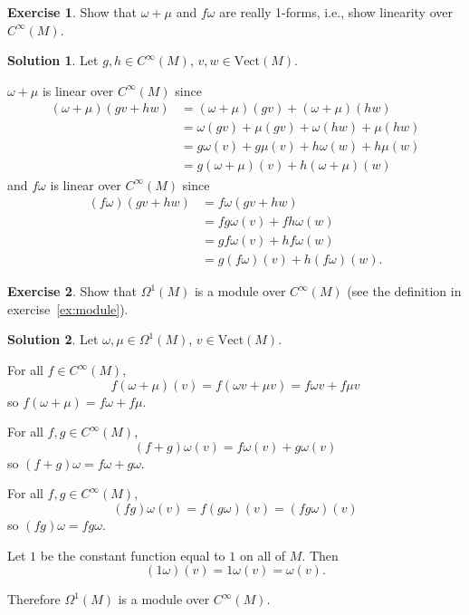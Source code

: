 \documentclass[11pt, a4paper]{article}
\theoremstyle{definition}
\newtheorem{ex}{Exercise}[part]
\newtheorem{sol}{Solution}[part]
\begin{document}
\begin{ex}

Show that $\omega + \mu$ and $f\omega$ are really 1-forms, i.e., show linearity over $C^\infty(M)$.

\end{ex}

\begin{sol}

Let $g, h \in C^\infty(M)$, $v, w \in \text{Vect}(M)$.

$\omega + \mu$ is linear over $C^\infty(M)$ since
\begin{align*}
    (\omega + \mu)(gv + hw) &= (\omega + \mu)(gv) + (\omega + \mu)(hw) \\
        &= \omega(gv) + \mu(gv) + \omega(hw) + \mu(hw) \\
        &= g\omega(v) + g\mu(v) + h\omega(w) + h\mu(w) \\
        &= g(\omega + \mu)(v)  + h(\omega + \mu)(w)
\end{align*}
and $f\omega$ is linear over $C^\infty(M)$ since
\begin{align*}
    (f\omega)(gv + hw) &= f\omega(gv + hw) \\
                       &= fg\omega(v) + fh\omega(w) \\
                       &= gf\omega(v) + hf\omega(w) \\
                       &= g(f\omega)(v) + h(f\omega)(w).
\end{align*}

\end{sol}

\begin{ex}

Show that $\Omega^1(M)$ is a module over $C^\infty(M)$ (see the definition in exercise~\ref{ex:module}).

\end{ex}

\begin{sol}

Let $\omega, \mu \in \Omega^1(M)$, $v\in \text{Vect}(M)$.

For all $f \in C^\infty(M)$,
\[
    f(\omega + \mu)(v) = f(\omega v + \mu v) = f\omega v + f\mu v
\]
so $f(\omega + \mu) = f\omega + f\mu$.

For all $f, g \in C^\infty(M)$,
\[
    (f + g)\omega(v) = f\omega(v) + g\omega(v)
\]
so $(f + g)\omega = f\omega + g\omega$.

For all $f, g \in C^\infty(M)$,
\[
    (fg)\omega(v) = f(g\omega)(v) = (fg\omega)(v)
\]
so $(fg)\omega = fg\omega$.

Let $1$ be the constant function equal to $1$ on all of $M$. Then
\[
    (1\omega)(v) = 1\omega(v) = \omega(v).
\]

Therefore $\Omega^1(M)$ is a module over $C^\infty(M)$.

\end{sol}
\end{document}
